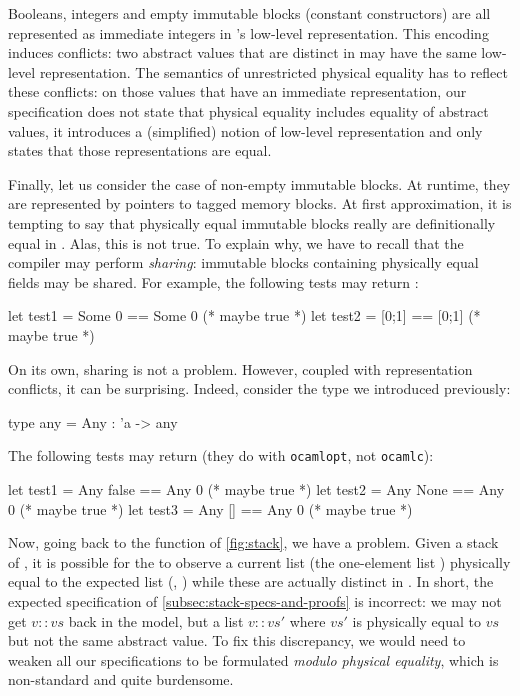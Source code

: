 Booleans, integers and empty immutable blocks (constant constructors) are all represented as immediate integers in \OCaml's low-level representation. This encoding induces conflicts: two abstract values that are distinct in \Rocq may have the same low-level representation.
The semantics of unrestricted physical equality has to reflect these conflicts: on those values that have an immediate representation, our specification does not state that physical equality includes equality of abstract values, it introduces a (simplified) notion of low-level representation and only states that those representations are equal.

Finally, let us consider the case of non-empty immutable blocks.
At runtime, they are represented by pointers to tagged memory blocks.
At first approximation, it is tempting to say that physically equal immutable blocks really are definitionally equal in \Rocq.
Alas, this is not true.
To explain why, we have to recall that the \OCaml compiler may perform \emph{sharing}: immutable blocks containing physically equal fields may be shared.
For example, the following tests may return :
\begin{ocamlcode}
let test1 = Some 0 == Some 0 (* maybe true *)
let test2 = [0;1]  == [0;1]  (* maybe true *)
\end{ocamlcode}

On its own, sharing is not a problem.
However, coupled with representation conflicts, it can be surprising.
Indeed, consider the  type we introduced previously:
\begin{ocamlcode}
type any = Any : 'a -> any
\end{ocamlcode}
The following tests may return  (they do with \texttt{ocamlopt}, not \texttt{ocamlc}):
\begin{ocamlcode}
let test1 = Any false == Any 0 (* maybe true *)
let test2 = Any None  == Any 0 (* maybe true *)
let test3 = Any []    == Any 0 (* maybe true *)
\end{ocamlcode}

Now, going back to the  function of \cref{fig:stack}, we have a problem.
Given a stack of , it is possible for the  to observe a current list (\eg the one-element list \ocamlinline{[Any 0]}) physically equal to the expected list (\eg, ) while these are actually distinct in \Rocq.
In short, the expected specification of \cref{subsec:stack-specs-and-proofs} is incorrect: we may not get $v :: vs$ back in the model, but a list $v :: vs'$ where $vs'$ is physically equal to $vs$ but not the same abstract value.
To fix this discrepancy, we would need to weaken all our specifications to be formulated \emph{modulo physical equality}, which is non-standard and quite burdensome.

